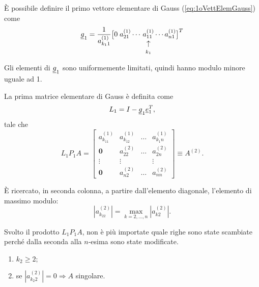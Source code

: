 È possibile definire il primo vettore elementare di Gauss (\ref{eq:1oVettElemGauss}) come
\begin{equation*}
    \uline g_1=\frac{1}{a_{k_11}^{(1)}}\big[0\; a_{21}^{(1)}\cdots\, \vrightarrowup{a_{11}^{(1)}}{k_1}\cdots a_{n1}^{(1)}\big]^T
\end{equation*}
\begin{remark}
    Gli elementi di $\uline g_1$ sono uniformemente limitati, quindi hanno modulo minore uguale ad 1.
\end{remark}

La prima matrice elementare di Gauss è definita come
\begin{equation*}
    L_1 = I - \uline g_1 \uline e_1^T,
\end{equation*}
tale che
\begin{equation*}
    L_1 P_1 A = 
    \begin{bmatrix}
        a_{k_11}^{(1)} & a_{k_12}^{(1)} & \hdots & a_{k_1n}^{(1)}\\
        \boldsymbol 0 & a_{22}^{(2)} & \hdots & a_{2n}^{(2)}\\
        \vdots & \vdots & & \vdots\\
        \boldsymbol 0 & a_{n2}^{(2)} & \hdots & a_{nn}^{(2)}
    \end{bmatrix}\equiv A^{(2)}.
\end{equation*}

È ricercato, in seconda colonna, a partire dall'elemento diagonale, l'elemento di massimo modulo:
\begin{equation*}
    \left|a_{k_22}^{(2)}\right| = \underset{k=2,\hdots, n}{\max}\left|a_{k2}^{(2)}\right|.
\end{equation*}

Svolto il prodotto $L_1 P_1 A$, non è più importate quale righe sono state scambiate perché dalla seconda alla $n$-esima sono state modificate.

\begin{remark}
    \begin{enumerate}
        \item $k_2\geq 2;$
        \item se $\left|a_{k_2 2}^{(2)}\right|=0\Rightarrow A$ singolare.
    \end{enumerate}
\end{remark}


